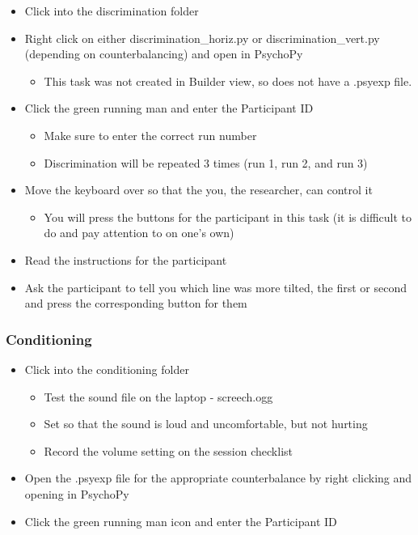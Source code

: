 \documentclass[
]{book}
\providecommand{\tightlist}{%
  \setlength{\itemsep}{0pt}\setlength{\parskip}{0pt}}
\begin{document}
\begin{itemize}
\tightlist
\item
  Click into the discrimination folder
\item
  Right click on either discrimination\_horiz.py or discrimination\_vert.py (depending on counterbalancing) and open in PsychoPy

  \begin{itemize}
  \tightlist
  \item
    This task was not created in Builder view, so does not have a .psyexp file.
  \end{itemize}
\item
  Click the green running man and enter the Participant ID

  \begin{itemize}
  \tightlist
  \item
    Make sure to enter the correct run number
  \item
    Discrimination will be repeated 3 times (run 1, run 2, and run 3)
  \end{itemize}
\item
  Move the keyboard over so that the you, the researcher, can control it

  \begin{itemize}
  \tightlist
  \item
    You will press the buttons for the participant in this task (it is difficult to do and pay attention to on one's own)
  \end{itemize}
\item
  Read the instructions for the participant
\item
  Ask the participant to tell you which line was more tilted, the first or second and press the corresponding button for them
\end{itemize}

\hypertarget{conditioning}{%
\subsubsection{Conditioning}\label{conditioning}}

\begin{itemize}
\tightlist
\item
  Click into the conditioning folder

  \begin{itemize}
  \tightlist
  \item
    Test the sound file on the laptop - screech.ogg
  \item
    Set so that the sound is loud and uncomfortable, but not hurting
  \item
    Record the volume setting on the session checklist
  \end{itemize}
\item
  Open the .psyexp file for the appropriate counterbalance by right clicking and opening in PsychoPy
\item
  Click the green running man icon and enter the Participant ID
\end{itemize}
\end{document}

